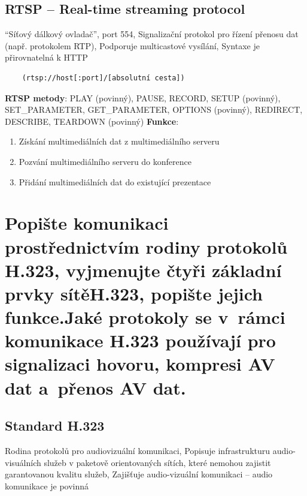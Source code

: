 \subsection{RTSP -- Real-time streaming protocol}
“Síťový dálkový ovladač”, port 554, Signalizační protokol pro řízení přenosu dat (např. protokolem RTP), Podporuje multicastové vysílání, Syntaxe je přirovnatelná k HTTP 
\begin{verbatim}
    (rtsp://host[:port]/[absolutní cesta])
\end{verbatim}
\textbf{RTSP metody}: \newline
PLAY (povinný), PAUSE, RECORD, SETUP (povinný), SET\_PARAMETER, \newline 
GET\_PARAMETER, OPTIONS (povinný), REDIRECT, DESCRIBE, \newline 
TEARDOWN (povinný) \newline \newline
\textbf{Funkce}:
\begin{enumerate}
    \item Získání multimediálních dat z multimediálního serveru
    \item Pozvání multimediálního serveru do konference
    \item Přidání multimediálních dat do existující prezentace
\end{enumerate}


\newpage
\section[Popište komunikaci prostřednictvím rodiny protokolů H.323, vyjmenujte čtyři základní prvky sítě H.323, popište jejich funkce. Jaké protokoly se v rámci komunikace H.323 používají pro signalizaci hovoru, kompresi AV dat a přenos AV dat.]{Popište komunikaci prostřednictvím rodiny protokolů H.323, vyjmenujte čtyři základní prvky sítě\newline H.323, popište jejich funkce.\newline Jaké protokoly se v~rámci komunikace H.323 používají pro signalizaci hovoru, kompresi AV dat a~přenos AV dat.}
\subsection{Standard H.323} 
Rodina protokolů pro audiovizuální komunikaci, Popisuje infrastrukturu audio-visuálních služeb v paketově orientovaných sítích, které nemohou zajistit garantovanou kvalitu služeb, Zajišťuje audio-vizuální komunikaci – audio komunikace je povinná

